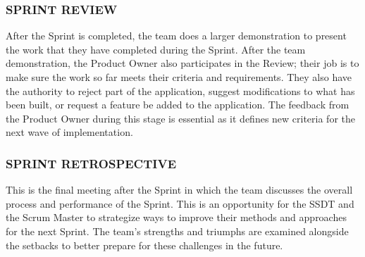 \subsubsection{SPRINT REVIEW}
After the Sprint is completed, the team does a larger demonstration to present the work that they have completed during the Sprint. After the team demonstration, the Product Owner also participates in the Review; their job is to make sure the work so far meets their criteria and requirements. They also have the authority to reject part of the application, suggest modifications to what has been built, or request a feature be added to the application. The feedback from the Product Owner during this stage is essential as it defines new criteria for the next wave of implementation.

\subsubsection{SPRINT RETROSPECTIVE}
This is the final meeting after the Sprint in which the team discusses the overall process and performance of the Sprint. This is an opportunity for the SSDT and the Scrum Master to strategize ways to improve their methods and approaches for the next Sprint. The team's strengths and triumphs are examined alongside the setbacks to better prepare for these challenges in the future.
